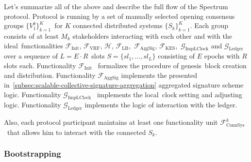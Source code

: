 Let's summarize all of the above and describe the full flow of the Spectrum protocol.
Protocol is running by a set of manually selected opening consensus groups $\{V^k_1\}_{k=1}^K$\
for $K$ connected distributed systems $\{S_k\}_{k=1}^K$.
Each group consists of at least $M_k$ stakeholders interacting with each other and with the ideal\
functionalities $\mathcal{F}_{\text{Init}}$, ${\mathcal{F}}_{\text{VRF}}$, $\mathcal{H}$, ${\mathcal{F}}_{\text{LB}}$,\
$\mathcal{F}_{\text{AggSig}}$, ${\mathcal{F}}_{\text{KES}}$,\
$\mathcal{G}_{\text{ImpLClock}}$ and $\mathcal{G}_{\text{Ledger}}$ over a sequence of $L = E \cdot R$\
slots ${S=\{sl_1,\dots,sl_L\}}$ consisting of $E$ epochs with $R$ slots each.
Functionality ${\mathcal{F}}_{\text{Init}}$~\cite{Badertscher2018} formalizes the procedure of genesis\
block creation and distribution.
Functionality ${\mathcal{F}}_{\text{AggSig}}$ implements the presented in~\ref{subsec:scalable-collective-signature-aggregation} aggregated signature scheme logic.
Functionality $\mathcal{G}_{\text{ImpLClock}}$~\cite{cryptoeprint:2019/838} implements the local\
clock setting and adjusting logic.
Functionality $\mathcal{G}_{\text{Ledger}}$ implements the logic of interaction with the ledger.

Also, each protocol participant maintains at least one functionality unit $\mathcal{F}^k_{\text{ConnSys}}$\
that allows him to interact with the connected $S_k$.

\subsubsection{Bootstrapping}\label{subsubsec:bootstrapping}

